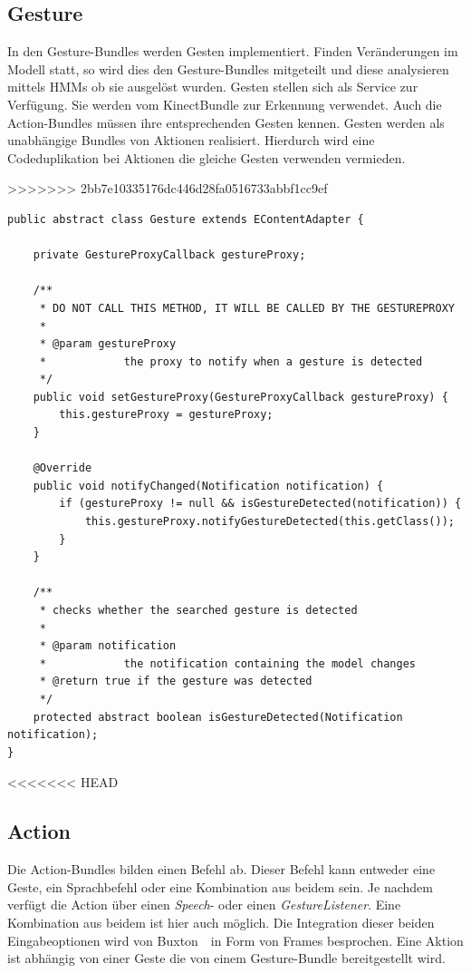 \subsection{Gesture}

In den Gesture-Bundles werden Gesten implementiert. Finden Ver\"anderungen im Modell statt, so wird dies den Gesture-Bundles mitgeteilt und diese analysieren mittels HMMs ob sie ausgel\"ost wurden. Gesten stellen sich als Service zur Verf\"ugung. Sie werden vom KinectBundle zur Erkennung verwendet. Auch die Action-Bundles m\"ussen ihre entsprechenden Gesten kennen. Gesten werden als unabh\"angige Bundles von Aktionen realisiert. Hierdurch wird eine Codeduplikation bei Aktionen die gleiche Gesten verwenden vermieden.

\lstset{language=Java,
 basicstyle=\footnotesize, 
 numbers=left,
 captionpos=b,
 showspaces=false,             
 showstringspaces=false,}
>>>>>>> 2bb7e10335176dc446d28fa0516733abbf1cc9ef
\begin{lstlisting}[caption={Klasse Gesture}, label={listing:Gesture}]
public abstract class Gesture extends EContentAdapter {

	private GestureProxyCallback gestureProxy;

	/**
	 * DO NOT CALL THIS METHOD, IT WILL BE CALLED BY THE GESTUREPROXY
	 * 
	 * @param gestureProxy
	 *            the proxy to notify when a gesture is detected
	 */
	public void setGestureProxy(GestureProxyCallback gestureProxy) {
		this.gestureProxy = gestureProxy;
	}

	@Override
	public void notifyChanged(Notification notification) {
		if (gestureProxy != null && isGestureDetected(notification)) {
			this.gestureProxy.notifyGestureDetected(this.getClass());
		}
	}

	/**
	 * checks whether the searched gesture is detected
	 * 
	 * @param notification
	 *            the notification containing the model changes
	 * @return true if the gesture was detected
	 */
	protected abstract boolean isGestureDetected(Notification notification);
}
\end{lstlisting}
<<<<<<< HEAD
\par\smallskip

\subsection{Action}
\label{subsec:osgiaction}

Die Action-Bundles bilden einen Befehl ab. Dieser Befehl kann entweder eine Geste, ein Sprachbefehl oder eine Kombination aus beidem sein. 
Je nachdem verf\"ugt die Action \"uber einen \textit{Speech}- oder einen \textit{GestureListener}. Eine Kombination aus beidem ist hier 
auch m\"oglich. Die Integration dieser beiden Eingabeoptionen wird von Buxton~\cite{bib:buxton}~\footnotemark[4] in Form von Frames besprochen. 
Eine Aktion ist abh\"angig von einer Geste die von einem Gesture-Bundle bereitgestellt wird.

